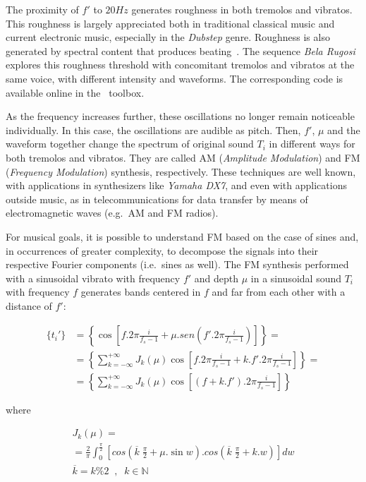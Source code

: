The proximity of $f'$ to $20Hz$ generates roughness in both tremolos and vibratos. This roughness is largely appreciated both in traditional classical music and current electronic music, especially in the \emph{Dubstep} genre. Roughness is also generated by spectral content that produces beating~\cite{Porres,porres2009}. The sequence \emph{Bela Rugosi} explores this roughness threshold with concomitant tremolos and vibratos at the same voice, with different intensity and waveforms. The corresponding code is available online in the \massa\ toolbox.

As the frequency increases further, these oscillations no longer remain noticeable individually. In this case, the oscillations are audible as pitch. Then, $f'$, $\mu$ and the waveform together change the spectrum of original sound $T_i$ in different ways for both tremolos and vibratos. They are called AM (\emph{Amplitude Modulation}) and FM (\emph{Frequency Modulation}) synthesis,
respectively. These techniques are well known, with applications in
synthesizers like \emph{Yamaha DX7}, and even with applications outside music, as in telecommunications for data transfer by means of electromagnetic waves (e.g.\ AM and FM radios).

For musical goals, it is possible to understand FM based on the
case of sines and, in occurrences of greater complexity, to decompose the signals into their respective Fourier components (i.e.\ sines as well). The FM synthesis performed with a sinusoidal vibrato with frequency $f'$ and depth $\mu$ in a sinusoidal sound $T_i$ with frequency $f$ generates bands centered in $f$ and far from each other with a distance of $f'$:

\begin{equation}\label{eq:fmEsp}
\begin{split}
\{t_i'\} & = \left \{ \cos \left [f . 2 \pi \frac{i}{f_s-1} + \mu . sen \left ( f' . 2 \pi \frac{i}{ f_s -1 } \right ) \right ] \right \} = \\
 & = \left \{ \sum_{k=-\infty}^{+\infty} J_k(\mu) \cos \left [ f . 2 \pi \frac{i}{f_s-1} + k . f' . 2 \pi \frac{i}{f_s-1} \right ]  \right \} = \\
 & = \left \{ \sum_{k=-\infty}^{+\infty} J_k(\mu) \cos \left [ (f+k.f') . 2 \pi \frac{i}{f_s-1} \right ]  \right \}
\end{split}
\end{equation}

\noindent where

\begin{multline}\label{eq:Bessel}
J_k(\mu) = \\ = \frac{2}{\pi} \int_0^{\frac{\pi}{2}}\left [ cos \left (\overline{k}\;\frac{\pi}{2} + \mu . \sin w \right ) . cos \left ( \overline{k}\;\frac{\pi}{2} + k . w \right ) \right ] dw \\  \overline{k} = k \% 2 \;\;,\;\; k \in \mathbb{N}
\end{multline}

